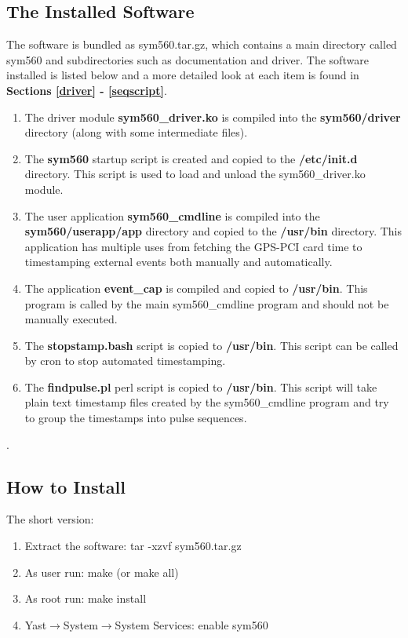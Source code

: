\documentclass[11pt]{article}
\begin{document}
\subsection{The Installed Software} \label{whatinstall}
The software is bundled as sym560.tar.gz, which contains a main directory called sym560 and subdirectories such as documentation and driver.  The software installed is listed below and a more detailed look at each item is found in \textbf{Sections \ref{driver} - \ref{seqscript}}.
\begin{enumerate}
 \item The driver module \textbf{sym560\_driver.ko} is compiled into the \textbf{sym560/driver} directory (along with some intermediate files).
 \item The \textbf{sym560} startup script is created and copied to the \textbf{/etc/init.d} directory.  This script is used to load and unload the sym560\_driver.ko module.
 \item The user application \textbf{sym560\_cmdline} is compiled into the \textbf{sym560/userapp/app} directory and copied to the \textbf{/usr/bin} directory.  This application has multiple uses from fetching the GPS-PCI card time to timestamping external events both manually and automatically.
 \item The application \textbf{event\_cap} is compiled and copied to \textbf{/usr/bin}.  This program is called by the main sym560\_cmdline program and should not be manually executed.
 \item The \textbf{stopstamp.bash} script is copied to \textbf{/usr/bin}.  This script can be called by cron to stop automated timestamping.
 \item The \textbf{findpulse.pl} perl script is copied to \textbf{/usr/bin}.  This script will take plain text timestamp files created by the sym560\_cmdline program and try to group the timestamps into pulse sequences.
\end{enumerate}
.

\subsection{How to Install} \label{howinstall}
The short version:
\begin{enumerate}
 \item Extract the software: tar -xzvf sym560.tar.gz
 \item As user run: make (or make all)
 \item As root run: make install
 \item Yast$\rightarrow$System$\rightarrow$System Services: enable sym560
\end{enumerate}
\end{document}
